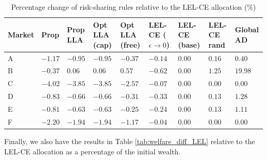 \documentclass[11pt,a4paper]{article}
\theoremstyle{definition}
\theoremstyle{plain}
\theoremstyle{remark}
\newcommand{\1}{\mathbf{1}}
\begin{document}
\begin{table}[htbp]
  \centering
  \small
  \caption{Percentage change of risk-sharing rules relative to the LEL-CE allocation (\%)}
  \label{tab:LEL_Results_Pct}
  \vspace{0.5em}
  \setlength{\tabcolsep}{3pt} %
  \begin{tabularx}{\textwidth}{l *{8}{Y}}
    \toprule
    \textbf{Market} & 
    \textbf{Prop} & 
    \textbf{Prop} \newline \textbf{LLA} & 
    \textbf{Opt LLA} \newline \textbf{(cap)} & 
    \textbf{Opt LLA} \newline \textbf{(free)} & 
    \textbf{LEL-CE} \newline \textbf{($\epsilon \to 0$)} & 
    \textbf{LEL-CE} \newline \textbf{(base)} & 
    \textbf{LEL-CE} \newline \textbf{rand} & 
    \textbf{Global} \newline \textbf{AD} \\
    \midrule
    A & $-1.17$ & $-0.95$ & $-0.95$ & $-0.37$ & $-0.14$ & $0.00$ & $0.16$  & $0.40$  \\
    B & $-0.37$ &  $0.06$ &  $0.06$ &  $0.57$ & $-0.62$ & $0.00$ & $1.25$  & $19.98$ \\
    C & $-4.02$ & $-3.85$ & $-3.85$ & $-2.57$ & $-0.07$ & $0.00$ & $0.00$  & $0.00$  \\
    D & $-0.83$ & $-0.66$ & $-0.66$ & $-0.31$ & $-0.33$ & $0.00$ & $0.13$  & $1.28$  \\
    E & $-0.81$ & $-0.63$ & $-0.63$ & $-0.25$ & $-0.24$ & $0.00$ & $0.13$  & $1.11$  \\
    F & $-2.20$ & $-1.94$ & $-1.94$ & $-1.17$ & $-0.04$ & $0.00$ & $0.00$  & $0.00$  \\
    \bottomrule
  \end{tabularx}
\end{table}
Finally, we also have the results in Table \ref{tab:welfare_diff_LEL} relative to the LEL-CE allocation as a percentage of the initial wealth.
\end{document}
